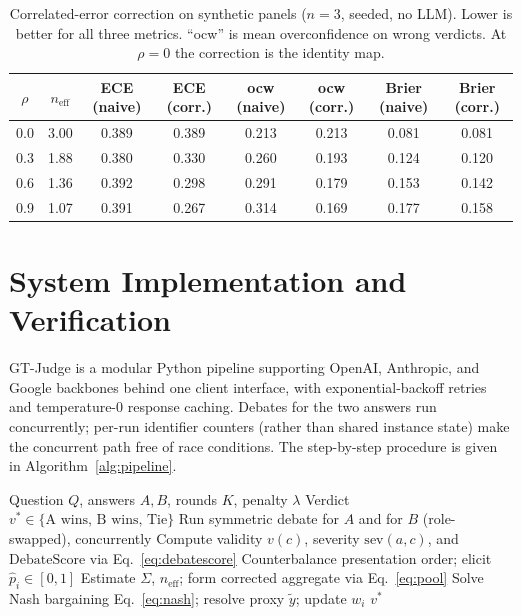\documentclass[11pt]{article}
\newcommand{\neff}{n_{\mathrm{eff}}}
\begin{document}
\begin{table}[t]
\centering
\caption{Correlated-error correction on synthetic panels ($n=3$, seeded, no
LLM). Lower is better for all three metrics. ``ocw'' is mean overconfidence on
wrong verdicts. At $\rho=0$ the correction is the identity map.}
\label{tab:corr}
\begin{tabular}{cccccccc}
\toprule
$\rho$ & $\neff$ & ECE (naive) & ECE (corr.) & ocw (naive) & ocw (corr.) & Brier (naive) & Brier (corr.)\\
\midrule
0.0 & 3.00 & 0.389 & 0.389 & 0.213 & 0.213 & 0.081 & 0.081\\
0.3 & 1.88 & 0.380 & 0.330 & 0.260 & 0.193 & 0.124 & 0.120\\
0.6 & 1.36 & 0.392 & 0.298 & 0.291 & 0.179 & 0.153 & 0.142\\
0.9 & 1.07 & 0.391 & 0.267 & 0.314 & 0.169 & 0.177 & 0.158\\
\bottomrule
\end{tabular}
\end{table}

\section{System Implementation and Verification}
GT-Judge is a modular Python pipeline supporting OpenAI, Anthropic, and Google
backbones behind one client interface, with exponential-backoff retries and
temperature-0 response caching. Debates for the two answers run concurrently;
per-run identifier counters (rather than shared instance state) make the
concurrent path free of race conditions. The step-by-step procedure is given in
Algorithm~\ref{alg:pipeline}.

\begin{algorithm}[t]
\caption{GT-Judge Evaluation Pipeline}
\label{alg:pipeline}
\begin{algorithmic}[1]
\Require Question $Q$, answers $A,B$, rounds $K$, penalty $\lambda$
\Ensure Verdict $v^*\in\{\text{A wins, B wins, Tie}\}$
\State Run symmetric debate for $A$ and for $B$ (role-swapped), concurrently
\State Compute validity $v(c)$, severity $\mathrm{sev}(a,c)$, and
$\mathrm{DebateScore}$ via Eq.~\eqref{eq:debatescore}
  \State Counterbalance presentation order; elicit $\hat p_i\in[0,1]$
\EndFor
\State Estimate $\Sigma$, $\neff$; form corrected aggregate via Eq.~\eqref{eq:pool}
\Repeat
  \State Solve Nash bargaining Eq.~\eqref{eq:nash}; resolve proxy $\tilde y$;
  update $w_i$
\State \Return $v^*$
\end{algorithmic}
\end{algorithm}
\end{document}

